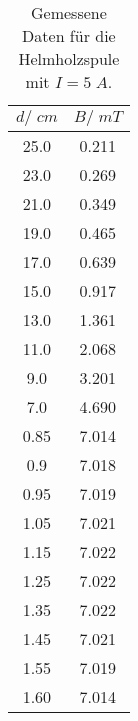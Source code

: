 \begin{table}[H]
  \centering
   \begin{tabular}{c c}
    \toprule
    $d /\;\si{cm}$ & $B/\;\si{mT}$ \\
    \midrule
    25.0 & 0.211\\
    23.0 & 0.269\\
    21.0 & 0.349\\
    19.0 & 0.465\\
    17.0 & 0.639\\
    15.0 & 0.917\\
    13.0 & 1.361\\
    11.0 & 2.068\\
    9.0 & 3.201\\
    7.0 & 4.690\\
    \hline
    0.85 & 7.014\\
    0.9 & 7.018\\
    0.95 & 7.019\\
    1.05 & 7.021\\
    1.15 & 7.022\\
    1.25 & 7.022\\
    1.35 & 7.022\\
    1.45 & 7.021\\
    1.55 & 7.019\\
    1.60 & 7.014\\
    \bottomrule
  \end{tabular}
  \caption{Gemessene Daten für die Helmholzspule mit $I=5\;\si{A}$.}
  \label{tab:tabelle4}
\end{table}
